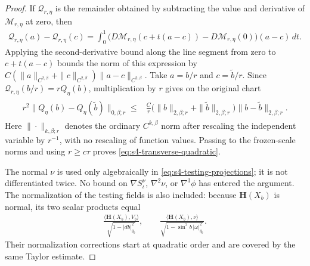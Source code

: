 \documentclass[a4paper,11pt,oneside,reqno]{amsart}
\numberwithin{equation}{section}
\theoremstyle{definition}
\begin{document}
\begin{proof}
    If $\mathcal Q_{r,\eta}$ is the remainder obtained by
    subtracting the value and derivative of $\mathcal M_{r,\eta}$
    at zero, then
    \begin{align*}
        \mathcal Q_{r,\eta}(a)-\mathcal Q_{r,\eta}(c)
        =\int_0^1\bigl(
        D\mathcal M_{r,\eta}(c+t(a-c))
        -D\mathcal M_{r,\eta}(0)\bigr)(a-c)\,dt.
    \end{align*}
    Applying the second-derivative bound along the line
    segment from zero to $c+t(a-c)$ bounds the norm of
    this expression by
    $C(\|a\|_{C^{2,\beta}}+\|c\|_{C^{2,\beta}})
    \|a-c\|_{C^{2,\beta}}$.
    Take $a=b/r$ and $c=\widetilde b/r$.
    Since $\mathcal Q_{r,\eta}(b/r)=rQ_\eta(b)$, multiplication
    by $r$ gives on the original chart
    \begin{align*}
        \begin{split}
            r^2\|Q_\eta(b)-Q_\eta(\widetilde b)\|_{0,\beta;r}
            \leq{}&\frac Cr\bigl(\|b\|_{2,\beta;r}
            +\|\widetilde b\|_{2,\beta;r}\bigr)
            \|b-\widetilde b\|_{2,\beta;r}.
        \end{split}
    \end{align*}
    Here $\|\cdot\|_{k,\beta;r}$ denotes the ordinary
    $C^{k,\beta}$ norm after rescaling the independent variable
    by $r^{-1}$, with no rescaling of function values. Passing
    to the frozen-scale norms and using $r\geq c\tau$ proves
    \eqref{eq:s4-transverse-quadratic}.

    The normal $\nu$ is used only algebraically in
    \eqref{eq:s4-testing-projections}; it is not differentiated
    twice. No bound on $\nabla S_\iota^\nu$, $\nabla^2\nu$, or
    $\nabla^3\phi$ has entered the argument. The normalization
    of the testing fields is also included: because
    $\mathbf{H}(X_b)$ is normal, its two scalar products equal
    \begin{align*}
        \frac{\langle\mathbf{H}(X_b),V_b\rangle}
        {\sqrt{1-|db|_{g_b}^2}},
        \qquad
        \frac{\langle\mathbf{H}(X_b),\nu\rangle}
        {\sqrt{1-\sin^2b\,|\omega|_{g_b}^2}}.
    \end{align*}
    Their normalization corrections start at quadratic order
    and are covered by the same Taylor estimate.
\end{proof}
\end{document}
